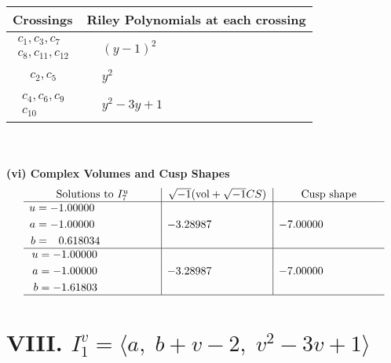 \documentclass[1p]{elsarticle_modified}
\theoremstyle{definition}
\newcommand{\I}{\sqrt{-1}}
\begin{document}
\begin{tabular}{m{50pt}|m{274pt}}
Crossings & \hspace{64pt}Riley Polynomials at each crossing \\
\hline $$\begin{aligned}c_{1},c_{3},c_{7}\\c_{8},c_{11},c_{12}\end{aligned}$$&$\begin{aligned}
&(y-1)^2
\end{aligned}$\\
\hline $$\begin{aligned}c_{2},c_{5}\end{aligned}$$&$\begin{aligned}
&y^2
\end{aligned}$\\
\hline $$\begin{aligned}c_{4},c_{6},c_{9}\\c_{10}\end{aligned}$$&$\begin{aligned}
&y^2-3 y+1
\end{aligned}$\\
\hline
\end{tabular}\\~\\
\newpage\flushleft \textbf{(vi) Complex Volumes and Cusp Shapes}
$$\begin{array}{c|c|c}  
\text{Solutions to }I^u_{7}& \I (\text{vol} + \sqrt{-1}CS) & \text{Cusp shape}\\
 \hline 
\begin{aligned}
u &= -1.00000\phantom{ +0.000000I} \\
a &= -1.00000\phantom{ +0.000000I} \\
b &= \phantom{-}0.618034\phantom{ +0.000000I}\end{aligned}
 & -3.28987\phantom{ +0.000000I} & -7.00000\phantom{ +0.000000I} \\ \hline\begin{aligned}
u &= -1.00000\phantom{ +0.000000I} \\
a &= -1.00000\phantom{ +0.000000I} \\
b &= -1.61803\phantom{ +0.000000I}\end{aligned}
 & -3.28987\phantom{ +0.000000I} & -7.00000\phantom{ +0.000000I}\\
 \hline 
 \end{array}$$\newpage\newpage\renewcommand{\arraystretch}{1}
\centering \section*{VIII. $I^v_{1}= \langle a,\;b+v-2,\;v^2-3 v+1 \rangle$}
\end{document}
